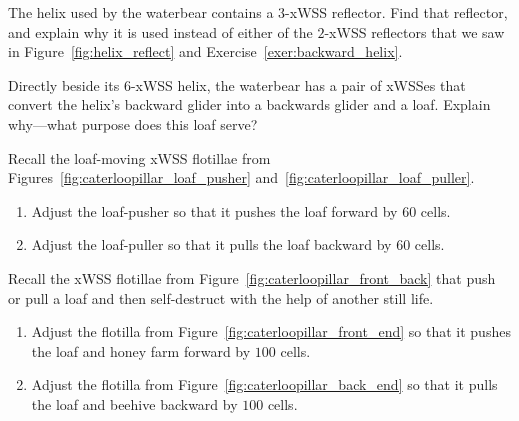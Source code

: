 \begin{multicols}{2}
\mfilbreak


\begin{problemstar}\label{exer:waterbear_one_more_helix_component} 
	The helix used by the waterbear contains a $3$-xWSS reflector. Find that reflector, and explain why it is used instead of either of the $2$-xWSS reflectors that we saw in Figure~\ref{fig:helix_reflect} and Exercise~\ref{exer:backward_helix}.
\end{problemstar}


\mfilbreak


\begin{problemstar}\label{exer:waterbear_why_loaf} 
	Directly beside its $6$-xWSS helix, the waterbear has a pair of xWSSes that convert the helix's backward glider into a backwards glider and a loaf. Explain why---what purpose does this loaf serve?
\end{problemstar}


\mfilbreak


\begin{problem}\label{exer:loaf_move_adjust} 
	Recall the loaf-moving xWSS flotillae from Figures~\ref{fig:caterloopillar_loaf_pusher} and~\ref{fig:caterloopillar_loaf_puller}.\smallskip
	
	\begin{enumerate}[label=\bf\color{ocre}(\alph*)]
		\item Adjust the loaf-pusher so that it pushes the loaf forward by $60$ cells.
		
		\item Adjust the loaf-puller so that it pulls the loaf backward by $60$ cells.
	\end{enumerate}
\end{problem}


\mfilbreak


\begin{problem}\label{exer:loaf_move_and_destroy_adjust} 
	Recall the xWSS flotillae from Figure~\ref{fig:caterloopillar_front_back} that push or pull a loaf and then self-destruct with the help of another still life.\smallskip
	
	\begin{enumerate}[label=\bf\color{ocre}(\alph*)]
		\item Adjust the flotilla from Figure~\ref{fig:caterloopillar_front_end} so that it pushes the loaf and honey farm forward by $100$ cells.
		
		\item Adjust the flotilla from Figure~\ref{fig:caterloopillar_back_end} so that it pulls the loaf and beehive backward by $100$ cells.
	\end{enumerate}
\end{problem}



\end{multicols}
